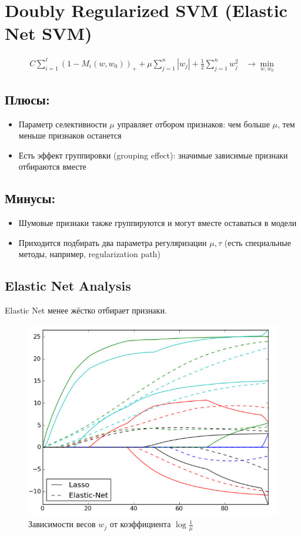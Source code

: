 \section{Doubly Regularized SVM (Elastic Net SVM)}

\begin{align*}
    C \sum_{i=1}^{\ell} \left(1 - M_i(w, w_0)\right)_+ + \mu \sum_{j=1}^{n} |w_j| + \frac{1}{2} \sum_{j=1}^{n} w_j^2 & \rightarrow \min_{w, w_0}
\end{align*}

\subsection*{Плюсы:}
\begin{itemize}
    \item Параметр селективности \(\mu\) управляет отбором признаков: чем больше \(\mu\), тем меньше признаков останется
    \item Есть эффект группировки (grouping effect): значимые зависимые признаки отбираются вместе
\end{itemize}

\subsection*{Минусы:}
\begin{itemize}
    \item Шумовые признаки также группируются и могут вместе оставаться в модели
    \item Приходится подбирать два параметра регуляризации \(\mu, \tau\) (есть специальные методы, например, regularization path)
\end{itemize}

\subsection{Elastic Net Analysis}

Elastic Net менее жёстко отбирает признаки.

\begin{figure}[ht]
    \centering
    \includegraphics[width=0.8\linewidth]{chapters/svm/images/Elastic_Net.png}
    \caption{Зависимости весов \(w_j\) от коэффициента \(\log \frac{1}{\mu}\)}
    \label{fig:elastic_net}
\end{figure}


